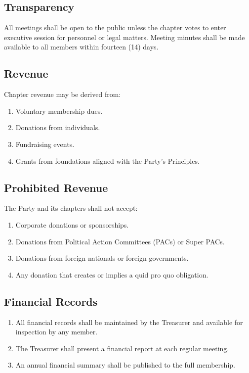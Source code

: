 \documentclass[11pt, letterpaper]{article}
\begin{document}
\subsection{Transparency}
All meetings shall be open to the public unless the chapter votes to enter executive session for personnel or legal matters. Meeting minutes shall be made available to all members within fourteen (14) days.



\subsection{Revenue}
Chapter revenue may be derived from:
\begin{enumerate}
  \item Voluntary membership dues.
  \item Donations from individuals.
  \item Fundraising events.
  \item Grants from foundations aligned with the Party's Principles.
\end{enumerate}

\subsection{Prohibited Revenue}
The Party and its chapters shall not accept:
\begin{enumerate}
  \item Corporate donations or sponsorships.
  \item Donations from Political Action Committees (PACs) or Super PACs.
  \item Donations from foreign nationals or foreign governments.
  \item Any donation that creates or implies a quid pro quo obligation.
\end{enumerate}

\subsection{Financial Records}
\begin{enumerate}
  \item All financial records shall be maintained by the Treasurer and available for inspection by any member.
  \item The Treasurer shall present a financial report at each regular meeting.
  \item An annual financial summary shall be published to the full membership.
\end{enumerate}
\end{document}

